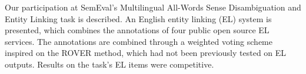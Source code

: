 Our participation at SemEval's Multilingual All-Words Sense Disambiguation and Entity Linking task is described. An English entity linking (EL) system is presented, which combines the annotations of four public open source EL services. The annotations are combined through a weighted voting scheme inspired on the ROVER method, which had not been previously tested on EL outputs. Results on the task's EL items were competitive.
